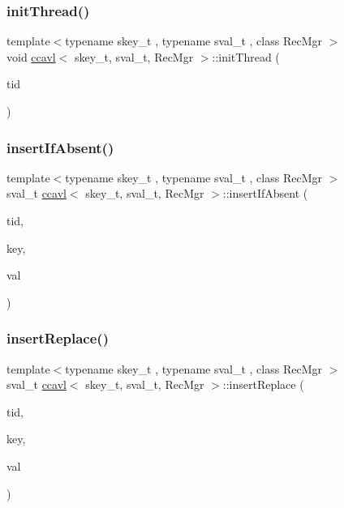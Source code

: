 \mbox{\label{classccavl_a3c5a7ce30103bd377abd52c94a0021e4}} 
\subsubsection{\texorpdfstring{init\+Thread()}{initThread()}}
{\footnotesize\ttfamily template$<$typename skey\+\_\+t , typename sval\+\_\+t , class Rec\+Mgr $>$ \\
void \hyperlink{classccavl}{ccavl}$<$ skey\+\_\+t, sval\+\_\+t, Rec\+Mgr $>$\+::init\+Thread (\begin{DoxyParamCaption}\item[{const int}]{tid }\end{DoxyParamCaption})\hspace{0.3cm}{\ttfamily [inline]}}

\mbox{\label{classccavl_acc5cd8e2ab2c439480b38a49462353cb}} 
\subsubsection{\texorpdfstring{insert\+If\+Absent()}{insertIfAbsent()}}
{\footnotesize\ttfamily template$<$typename skey\+\_\+t , typename sval\+\_\+t , class Rec\+Mgr $>$ \\
sval\+\_\+t \hyperlink{classccavl}{ccavl}$<$ skey\+\_\+t, sval\+\_\+t, Rec\+Mgr $>$\+::insert\+If\+Absent (\begin{DoxyParamCaption}\item[{const int}]{tid,  }\item[{skey\+\_\+t}]{key,  }\item[{sval\+\_\+t}]{val }\end{DoxyParamCaption})\hspace{0.3cm}{\ttfamily [inline]}}

\mbox{\label{classccavl_a1bccdb9a78b965bc23239ca142843701}} 
\subsubsection{\texorpdfstring{insert\+Replace()}{insertReplace()}}
{\footnotesize\ttfamily template$<$typename skey\+\_\+t , typename sval\+\_\+t , class Rec\+Mgr $>$ \\
sval\+\_\+t \hyperlink{classccavl}{ccavl}$<$ skey\+\_\+t, sval\+\_\+t, Rec\+Mgr $>$\+::insert\+Replace (\begin{DoxyParamCaption}\item[{const int}]{tid,  }\item[{skey\+\_\+t}]{key,  }\item[{sval\+\_\+t}]{val }\end{DoxyParamCaption})\hspace{0.3cm}{\ttfamily [inline]}}

